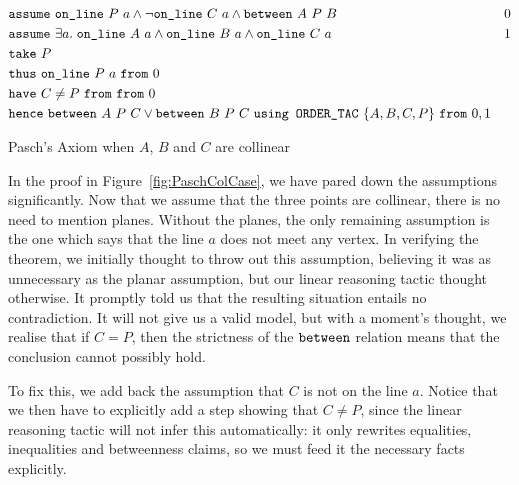 \begin{boxedfigure}
  \begin{align*}
    & \code{assume}\ \code{on\_line}\ P\ a\wedge\neg\code{on\_line}\ C\ a \wedge \between{A}{P}{B} & 0\\
    & \code{assume}\ \exists a.\; \code{on\_line}\ A\ a\wedge\code{on\_line}\ B\ a\wedge\code{on\_line}\ C\ a&1\\
    & \code{take}\ P\\
    & \code{thus}\ \code{on\_line}\ P\ a\ \code{from}\ 0\\
    & \code{have}\ C \neq P\ \code{from}\ \code{from}\ 0\\
    & \code{hence}\ \between{A}{P}{C} \vee \between{B}{P}{C}\ \code{using ORDER\_TAC}\ \{A,B,C,P\}\ \code{from}\ 0,1
  \end{align*}
  \caption{Pasch's Axiom when $A$, $B$ and $C$ are collinear}
  \label{fig:PaschColCase}
\end{boxedfigure}

In the proof in Figure~\ref{fig:PaschColCase}, we have pared down the assumptions significantly. Now that we assume that the three points are collinear, there is no need to mention planes. Without the planes, the only remaining assumption is the one which says that the line $a$ does not meet any vertex. In verifying the theorem, we initially thought to throw out this assumption, believing it was as unnecessary as the planar assumption, but our linear reasoning tactic thought otherwise. It promptly told us that the resulting situation entails no contradiction. It will not give us a valid model, but with a moment's thought, we realise that if $C = P$, then the strictness of the $\texttt{between}$ relation means that the conclusion cannot possibly hold.

To fix this, we add back the assumption that $C$ is not on the line $a$. Notice that we then have to explicitly add a step showing that $C \neq P$, since the linear reasoning tactic will not infer this automatically: it only rewrites equalities, inequalities and betweenness claims, so we must feed it the necessary facts explicitly.

